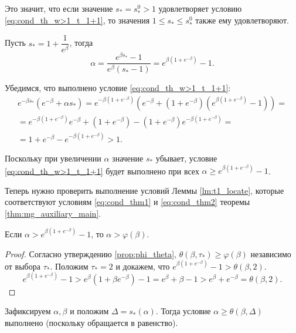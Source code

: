 Это значит, что если значение $s_* =  s_*^0 > 1$ удовлетворяет условию \eqref{eq:cond_th_w>1_t_1+1}, то значения $1 \leqslant  s_* \leqslant s_*^0$ также ему удовлетворяют.

Пусть $s_* = 1 + \dfrac{1}{e^{\beta}}$, тогда
\begin{equation}
	\alpha = \frac{e^{\beta s_*} - 1}{e^{\beta}(s_* - 1)} = e^{\beta(1 + e^{-\beta})} - 1.
\end{equation}

Убедимся, что выполнено условие \eqref{eq:cond_th_w>1_t_1+1}:
\begin{multline}
	e^{-\beta s_*}(e^{-\beta} + \alpha s_*) =
	e^{-\beta (1 + e^{-\beta})}\left(e^{-\beta} + (1 + e^{-\beta})(e^{\beta(1 + e^{-\beta})} - 1)\right) =\\
	= e^{-\beta (1 + e^{-\beta})} e^{-\beta} + (1 + e^{-\beta}) - (1 + e^{-\beta})e^{-\beta (1 + e^{-\beta})} = \\ = 1 + e^{-\beta} - e^{-\beta (1 + e^{-\beta})} > 1.
\end{multline}

Поскольку при увеличении $\alpha$ значение $s_*$ убывает, условие \eqref{eq:cond_th_w>1_t_1+1} будет выполнено при всех $\alpha \geqslant e^{\beta(1 + e^{-\beta})} - 1$.

Теперь нужно проверить выполнение условий Леммы \ref{lm:t1_locate}, которые соответствуют условиям \eqref{eq:cond_thm1} и \eqref{eq:cond_thm2} теоремы \ref{thm:mg_auxiliary_main}.

\begin{proposition}
	\label{prop:alpha_greater_phi}
	Если $\alpha > e^{\beta(1 + e^{-\beta})} - 1$, то $\alpha > \varphi(\beta)$.
\end{proposition}
\begin{proof}
	Согласно утверждению \ref{prop:phi_theta}, $\theta(\beta, \tau_*) \geqslant \varphi(\beta)$ независимо от выбора $\tau_*$. Положим $\tau_* = 2$ и докажем, что $e^{\beta(1 + e^{-\beta})} - 1 > \theta(\beta, 2)$.
	\[
	e^{\beta(1 + e^{-\beta})} - 1 >
	e^{\beta} (1 + \beta e^{-\beta}) - 1 =
	e^{\beta} + \beta - 1 > e^{\beta} + e^{-\beta} = \theta(\beta, 2).
	\]
\end{proof}

Зафиксируем $\alpha, \beta$ и положим $\Delta =  s_*(\alpha)$. Тогда условие $\alpha \geqslant \theta(\beta, \Delta)$ выполнено (поскольку обращается в равенство).

